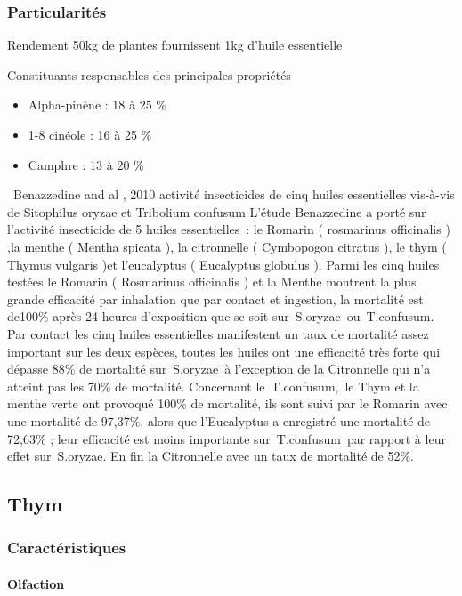 \documentclass[12pt,a4wide]{article}
\begin{document}
\subsubsection{Particularités}
\label{sec-4-9-3}
Rendement
50kg de plantes fournissent 1kg d'huile essentielle

Constituants responsables des principales propriétés

\begin{itemize}
\item Alpha-pinène : 18 à 25 \%
\item 1-8 cinéole : 16 à 25 \%
\item Camphre : 13 à 20 \%
\end{itemize}


 Benazzedine and al , 2010 activité insecticides de cinq huiles essentielles vis-à-vis de Sitophilus oryzae et Tribolium confusum
L'étude Benazzedine a porté sur l'activité insecticide de 5 huiles essentielles : le Romarin ( rosmarinus officinalis ) ,la menthe ( Mentha spicata ), la citronnelle ( Cymbopogon citratus ), le thym ( Thymus vulgaris )et l'eucalyptus ( Eucalyptus globulus ). 
Parmi les cinq huiles testées le Romarin ( Rosmarinus officinalis ) et la Menthe montrent la plus grande efficacité par inhalation que par contact et ingestion, la mortalité est de100\% après 24 heures d'exposition que se soit sur S.oryzae ou T.confusum.
Par contact les cinq huiles essentielles manifestent un taux de mortalité assez important sur les deux espèces, toutes les huiles ont une efficacité très forte qui dépasse 88\% de mortalité sur S.oryzae à l'exception de la Citronnelle qui n'a atteint pas les 70\% de mortalité. Concernant le T.confusum, le Thym et la menthe verte ont provoqué 100\% de mortalité, ils sont suivi par le Romarin avec une mortalité de 97,37\%, alors que l'Eucalyptus a enregistré une mortalité de 72,63\% ; leur efficacité est moins importante sur T.confusum par rapport à leur effet sur S.oryzae. En fin la Citronnelle avec un taux de mortalité de 52\%.


\subsection{Thym}
\label{sec-4-10}

\subsubsection{Caractéristiques}
\label{sec-4-10-1}

\paragraph{Olfaction}
\label{sec-4-10-1-1}
\end{document}
